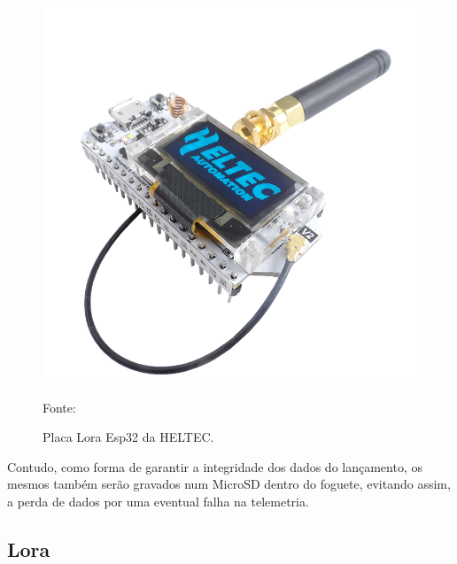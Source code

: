 \begin{figure}[!htb]
\centering
\includegraphics[scale=0.35]{figuras/SAM_0748_800X800.png}  
\caption{Placa Lora Esp32 da HELTEC.}
{\footnotesize Fonte:\cite{datasheet_ESP32}}
\label{fig:Placa Esp32 Lora }
\end{figure}
\par Contudo, como forma de garantir a integridade dos dados do lançamento, os mesmos também serão gravados num MicroSD dentro do foguete, evitando assim, a perda de dados por uma eventual falha na telemetria. 

\subsection{Lora}

